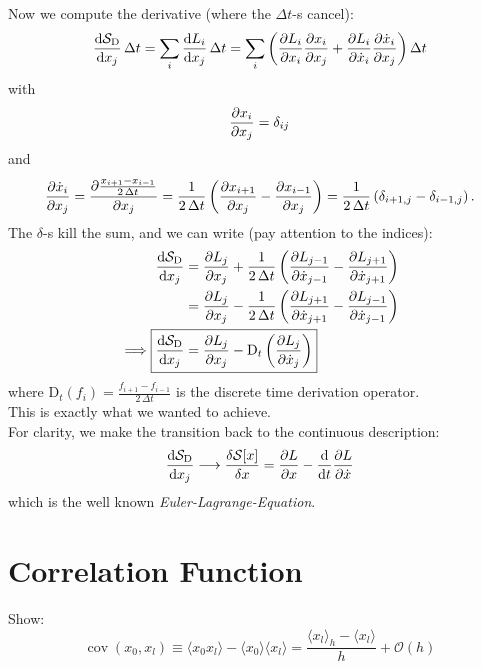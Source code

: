\documentclass[11pt,a4paper]{scrartcl}
\newcommand{\SD}{\ensuremath{\mathcal{S}_{\mathrm{D}}}}
\newcommand{\xdoti}{\ensuremath{\dot{x}_i}}
\newcommand{\xdotj}{\ensuremath{\dot{x}_j}}
\newcommand{\xdotjm}{\ensuremath{\dot{x}_{j-1}}}
\newcommand{\deltaij}{\ensuremath{\delta_{ij}}}
\newcommand{\DT}{\ensuremath{\mathrm{D}_t}}
\newcommand{\OverTwoDeltaT}[1]{\ensuremath{\frac{#1}{2\, \Delta t}}}
\newcommand{\xdotjp}{\ensuremath{\dot{x}_{j+1}}}
\newcommand{\avg}[1]{\langle#1\rangle}
\newcommand{\BigO}[1]{\mathcal{O}\left(#1\right)}
\DeclareMathOperator{\cov}{cov}
\begin{document}
Now we compute the derivative
(where the $\Delta t$-s cancel):
\begin{equation*}
    \dv{\SD}{x_j}\,\Delta t=\sum_i\dv{L_i}{x_j}\,\Delta t
    =\sum_i\left(\pdv{L_i}{x_i}\pdv{x_i}{x_j}+\pdv{L_i}{\xdoti}\pdv{\xdoti}{x_j}\right)
    \Delta t
\end{equation*}
with
\begin{equation*}
    \pdv{x_i}{x_j}=\deltaij
\end{equation*}
and
\begin{equation*}
    \pdv{\xdoti}{x_j}=\pdv{\OverTwoDeltaT{x_{i+1}-x_{i-1}}}{x_j}
    =\OverTwoDeltaT{1}\left(\pdv{x_{i+1}}{x_j}-\pdv{x_{i-1}}{x_j}\right)
    =\OverTwoDeltaT{1}\left(\delta_{i+1,j}-\delta_{i-1,j}\right).
\end{equation*}
The $\delta$-s kill the sum, and we can write (pay attention to the indices):
\begin{align*}
    \dv{\SD}{x_j}&=\pdv{L_j}{x_j}+\OverTwoDeltaT{1}\left(\pdv{L_{j-1}}{\xdotjm}-\pdv{L_{j+1}}{\xdotjp}\right)\\
    &=\pdv{L_j}{x_j}-\OverTwoDeltaT{1}\left(\pdv{L_{j+1}}{\xdotjp}-\pdv{L_{j-1}}{\xdotjm}\right)\\
    \implies\Aboxed{\dv{\SD}{x_j}&=\pdv{L_j}{x_j}-\DT\left(\pdv{L_{j}}{\xdotj}\right)}
\end{align*}
where $\DT(f_i)=\OverTwoDeltaT{f_{i+1}-f_{i-1}}$ is the discrete time derivation
operator.\\
This is exactly what we wanted to achieve.\\

For clarity, we make the transition back to the continuous description:
\begin{equation*}
    \dv{\SD}{x_j}\longrightarrow\fdv{\mathcal{S}[x]}{x}=\pdv{L}{x}-\dv{t}\pdv{L}{\dot{x}}
\end{equation*}
which is the well known \emph{Euler-Lagrange-Equation}.


\section*{Correlation Function}
Show:
\begin{equation*}
    \cov(x_0, x_l) \equiv \avg{x_0 x_l}-\avg{x_0}\avg{x_l}
    = \frac{\avg{x_l}_h-\avg{x_l}}{h}+\BigO{h}
\end{equation*}
\end{document}
